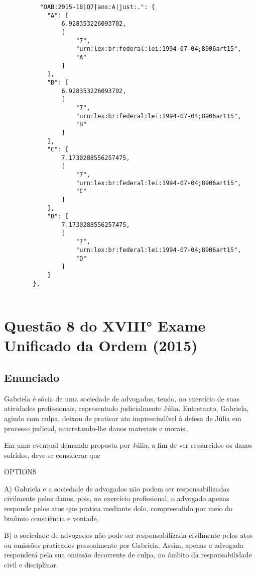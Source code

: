 \documentclass[12pt]{article}
\begin{document}
\begin{lstlisting}
          "OAB:2015-18|Q7|ans:A|just:.": {
            "A": [
                6.928353226093702,
                [
                    "7",
                    "urn:lex:br:federal:lei:1994-07-04;8906art15",
                    "A"
                ]
            ],
            "B": [
                6.928353226093702,
                [
                    "7",
                    "urn:lex:br:federal:lei:1994-07-04;8906art15",
                    "B"
                ]
            ],
            "C": [
                7.1730288556257475,
                [
                    "7",
                    "urn:lex:br:federal:lei:1994-07-04;8906art15",
                    "C"
                ]
            ],
            "D": [
                7.1730288556257475,
                [
                    "7",
                    "urn:lex:br:federal:lei:1994-07-04;8906art15",
                    "D"
                ]
            ]
        },
        
\end{lstlisting}



\section{Questão 8 do XVIII° Exame Unificado da Ordem (2015)}

\subsection{Enunciado}

Gabriela é sócia de uma sociedade de advogados, tendo, no 
exercício de suas atividades profissionais, representado 
judicialmente Júlia. Entretanto, Gabriela, agindo com culpa, 
deixou de praticar ato imprescindível à defesa de Júlia em 
processo judicial, acarretando-lhe danos materiais e morais.  
 
Em uma eventual demanda proposta por Júlia, a fim de ver 
ressarcidos os danos sofridos, deve-se considerar que 

OPTIONS

A) Gabriela e a sociedade de advogados não podem ser 
responsabilizadas civilmente pelos danos, pois, no 
exercício profissional, o advogado apenas responde pelos 
atos que pratica mediante dolo, compreendido por meio 
do binômio consciência e vontade. 

B) a sociedade de advogados não pode ser responsabilizada 
civilmente pelos atos ou omissões praticados 
pessoalmente por Gabriela. Assim, apenas a advogada 
responderá pela sua omissão decorrente de culpa, no 
âmbito da responsabilidade civil e disciplinar. 
\end{document}
